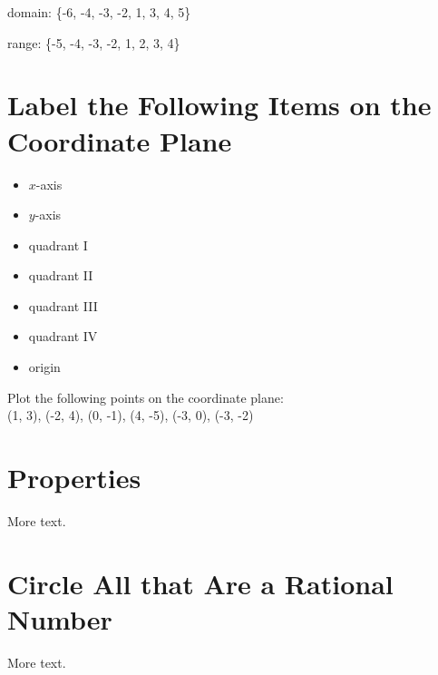 \documentclass[11pt]{article} %
\begin{document}
domain: \{-6, -4, -3, -2, 1, 3, 4, 5\}

range: \{-5, -4, -3, -2, 1, 2, 3, 4\}

\section{Label the Following Items on the Coordinate Plane}

\begin{itemize}
\item $x$-axis
\item $y$-axis
\item quadrant I
\item quadrant II
\item quadrant III
\item quadrant IV
\item origin
\end{itemize}
Plot the following points on the coordinate plane: \\
(1, 3), (-2, 4), (0, -1), (4, -5), (-3, 0), (-3, -2)

\section{Properties}

More text.

\section{Circle All that Are a Rational Number}

More text.
\end{document}
